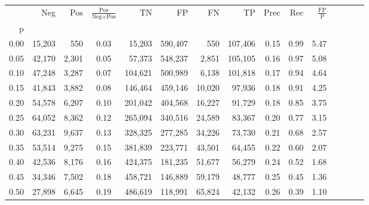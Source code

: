 \begin{tabular}{rrrcrrrrrrrrrrr}
\toprule
{} &     Neg &    Pos & $\frac{\text{Pos}}{\text{Neg}+\text{Pos}}$ &       TN &       FP &       FN &       TP &  Prec &   Rec & $\frac{\text{FP}}{\text{P}}$ \\
p    &         &        &                                            &          &          &          &          &       &       &                              \\
\midrule
0.00 &  15,203 &    550 &                                       0.03 &   15,203 &  590,407 &      550 &  107,406 &  0.15 &  0.99 &                         5.47 \\
0.05 &  42,170 &  2,301 &                                       0.05 &   57,373 &  548,237 &    2,851 &  105,105 &  0.16 &  0.97 &                         5.08 \\
0.10 &  47,248 &  3,287 &                                       0.07 &  104,621 &  500,989 &    6,138 &  101,818 &  0.17 &  0.94 &                         4.64 \\
0.15 &  41,843 &  3,882 &                                       0.08 &  146,464 &  459,146 &   10,020 &   97,936 &  0.18 &  0.91 &                         4.25 \\
0.20 &  54,578 &  6,207 &                                       0.10 &  201,042 &  404,568 &   16,227 &   91,729 &  0.18 &  0.85 &                         3.75 \\
0.25 &  64,052 &  8,362 &                                       0.12 &  265,094 &  340,516 &   24,589 &   83,367 &  0.20 &  0.77 &                         3.15 \\
0.30 &  63,231 &  9,637 &                                       0.13 &  328,325 &  277,285 &   34,226 &   73,730 &  0.21 &  0.68 &                         2.57 \\
0.35 &  53,514 &  9,275 &                                       0.15 &  381,839 &  223,771 &   43,501 &   64,455 &  0.22 &  0.60 &                         2.07 \\
0.40 &  42,536 &  8,176 &                                       0.16 &  424,375 &  181,235 &   51,677 &   56,279 &  0.24 &  0.52 &                         1.68 \\
0.45 &  34,346 &  7,502 &                                       0.18 &  458,721 &  146,889 &   59,179 &   48,777 &  0.25 &  0.45 &                         1.36 \\
0.50 &  27,898 &  6,645 &                                       0.19 &  486,619 &  118,991 &   65,824 &   42,132 &  0.26 &  0.39 &                         1.10 \\

\end{tabular}
